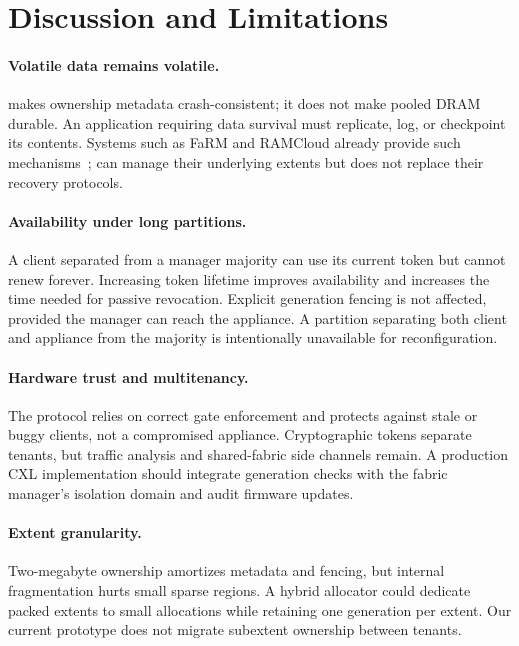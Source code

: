 \section{Discussion and Limitations}
\label{sec:discussion}

\paragraph{Volatile data remains volatile.}
\system makes ownership metadata crash-consistent; it does not make pooled
DRAM durable. An application requiring data survival must replicate, log, or
checkpoint its contents. Systems such as FaRM and RAMCloud already provide
such mechanisms~\cite{dragojevic2014farm,ousterhout2015ramcloud}; \system can
manage their underlying extents but does not replace their recovery protocols.

\paragraph{Availability under long partitions.}
A client separated from a manager majority can use its current token but cannot
renew forever. Increasing token lifetime improves availability and increases
the time needed for passive revocation. Explicit generation fencing is not
affected, provided the manager can reach the appliance. A partition separating
both client and appliance from the majority is intentionally unavailable for
reconfiguration.

\paragraph{Hardware trust and multitenancy.}
The protocol relies on correct gate enforcement and protects against stale or
buggy clients, not a compromised appliance. Cryptographic tokens separate
tenants, but traffic analysis and shared-fabric side channels remain. A
production CXL implementation should integrate generation checks with the
fabric manager's isolation domain and audit firmware updates.

\paragraph{Extent granularity.}
Two-megabyte ownership amortizes metadata and fencing, but internal
fragmentation hurts small sparse regions. A hybrid allocator could dedicate
packed extents to small allocations while retaining one generation per extent.
Our current prototype does not migrate subextent ownership between tenants.
